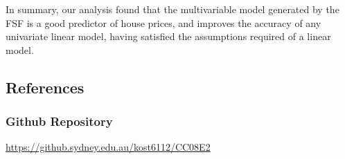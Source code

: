 \documentclass[letterpaper,9pt,twocolumn,twoside,]{pinp}
\begin{document}
In summary, our analysis found that the multivariable model generated by
the FSF is a good predictor of house prices, and improves the accuracy
of any univariate linear model, having satisfied the assumptions
required of a linear model.

\hypertarget{references}{%
\subsection{References}\label{references}}

\hypertarget{github-repository}{%
\subsubsection{Github Repository}\label{github-repository}}

\url{https://github.sydney.edu.au/kost6112/CC08E2}





\end{document}
